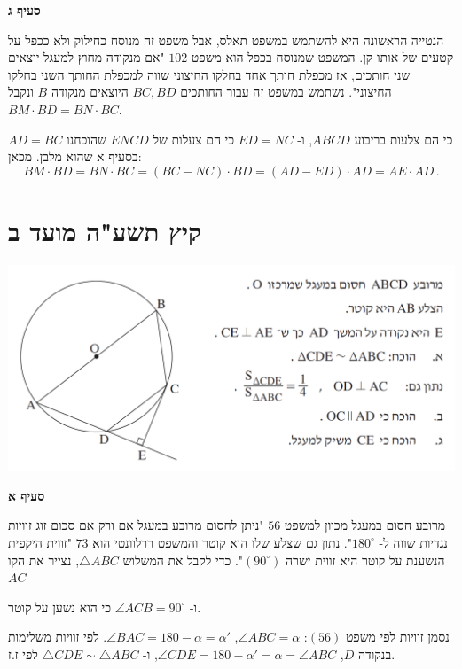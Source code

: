 \documentclass[12pt,a4paper]{article}
\newcommand*{\np}{\selectlanguage{english}\newpage\selectlanguage{hebrew}}
\begin{document}

\vspace{-30mm}

\textbf{סעיף ג}

הנטייה הראשונה היא להשתמש במשפט תאלס, אבל משפט זה מנוסח כחילוק ולא ככפל על קטעים של אותו קן. המשפט שמנוסח בכפל הוא משפט
$102$
"אם מנקודה מחוץ למעגל יוצאים שני חותכים, אז מכפלת חותך אחד בחלקו החיצוני שווה למכפלת החותך השני בחלקו החיצוני". נשתמש במשפט זה עבור החותכים
$BC,BD$
היוצאים מנקודה
$B$
ונקבל
$BM\cdot BD = BN \cdot BC$.

$AD=BC$
כי הם צלעות בריבוע 
$ABCD$,
ו-%
$ED=NC$
כי הם צעלות של
$ENCD$
שהוכחנו בסעיף א שהוא מלבן. מכאן:
\[
BM\cdot BD =  BN \cdot BC = (BC-NC)\cdot BD = (AD-ED) \cdot AD = AE\cdot AD\,.
\]



\np


\section{קיץ תשע"ה מועד ב}

\begin{center}
\includegraphics[width=\textwidth]{summer-2015b-4}
\end{center}

\textbf{סעיף א}

מרובע חסום במעגל מכוון למשפט
$56$
"ניתן לחסום מרובע במעגל אם ורק אם סכום זוג זוויות נגדיות שווה ל-%
$180^\circ$". 
נתון גם שצלע שלו הוא קוטר והמשפט ררלוונטי הוא
$73$
"זווית היקפית הנשענת על קוטר היא זווית ישרה 
$(90^\circ)$".
כדי לקבל את המשלוש
$\triangle ABC$,
נצייר את הקו
$AC$

ו-%
$\angle ACB=90^\circ$
כי הוא נשען על קוטר. 

נסמן זוויות לפי משפט
$(56)$:
$\angle ABC=\alpha$,
$\angle BAC=180-\alpha=\alpha'$.
לפי זוויות משלימות בנקודה
$D$,
$\angle CDE=180-\alpha'=\alpha=\angle ABC$,
ו-%
$\triangle CDE \sim \triangle ABC$
לפי ז.ז.
\end{document}
